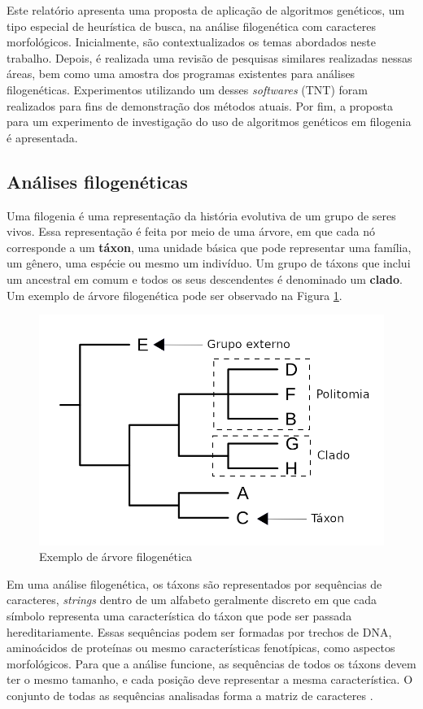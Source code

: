 \documentclass[12pt]{article}
\begin{document}
Este relatório apresenta uma proposta de aplicação de algoritmos genéticos, um tipo especial de heurística de busca, na análise filogenética com caracteres morfológicos. Inicialmente, são contextualizados os temas abordados neste trabalho. Depois, é realizada uma revisão de pesquisas similares realizadas nessas áreas, bem como uma amostra dos programas existentes para análises filogenéticas. Experimentos utilizando um desses \emph{softwares} (TNT) foram realizados para fins de demonstração dos métodos atuais. Por fim, a proposta para um experimento de investigação do uso de algoritmos genéticos em filogenia é apresentada.

\subsection{Análises filogenéticas}
Uma filogenia é uma representação da história evolutiva de um grupo de seres vivos. Essa representação é feita por meio de uma árvore, em que cada nó corresponde a um \textbf{táxon}, uma unidade básica que pode representar uma família, um gênero, uma espécie ou mesmo um indivíduo. Um grupo de táxons que inclui um ancestral em comum e todos os seus descendentes é denominado um \textbf{clado}. Um exemplo de árvore filogenética pode ser observado na Figura \ref{fig:phylogeny}.

\begin{figure}[ht]
  \centering
  \includegraphics[width=.8\textwidth]{img/phylogeny}
  \caption{Exemplo de árvore filogenética}
  \label{fig:phylogeny}
\end{figure}

Em uma análise filogenética, os táxons são representados por sequências de caracteres, \emph{strings} dentro de um alfabeto geralmente discreto em que cada símbolo representa uma característica do táxon que pode ser passada hereditariamente. Essas sequências podem ser formadas por trechos de DNA, aminoácidos de proteínas ou mesmo características fenotípicas, como aspectos morfológicos. Para que a análise funcione, as sequências de todos os táxons devem ter o mesmo tamanho, e cada posição deve representar a mesma característica. O conjunto de todas as sequências analisadas forma a matriz de caracteres \cite{bootstrap}.
\end{document}
